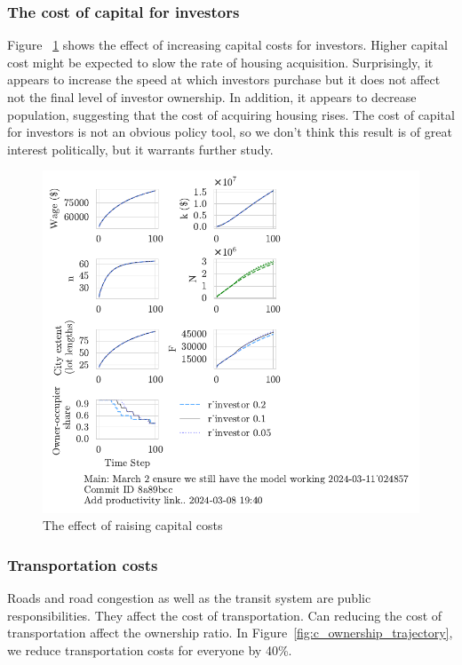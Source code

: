 \subsubsection{The cost of capital for investors}
Figure ~\ref{fig:capital_ownership_trajectory} shows the effect of increasing capital costs for investors. Higher capital cost might be expected to slow the rate of housing acquisition. Surprisingly, it appears to increase the speed at which investors purchase but it does not affect not the final level of investor ownership.  In addition, it appears to decrease population, suggesting that the cost of acquiring housing rises. The cost of capital for investors is not an obvious policy tool, so we don't think this result is of great interest politically, but it warrants further study.
\begin{figure}[h!t]
    \centering
    \includegraphics[scale=.8, trim={0 1.4cm 0 0},clip]{fig/r_investor-Main-024857.pdf}
    \caption{The effect of raising capital costs}
    \label{fig:capital_ownership_trajectory}
\end{figure}

\newpage
\subsubsection{Transportation costs}
Roads and road congestion as well as the transit system are public responsibilities. They affect the cost of transportation. Can reducing the cost of transportation affect the ownership ratio. In Figure~\ref{fig:c_ownership_trajectory}, we reduce transportation costs for everyone by 40\%. 

